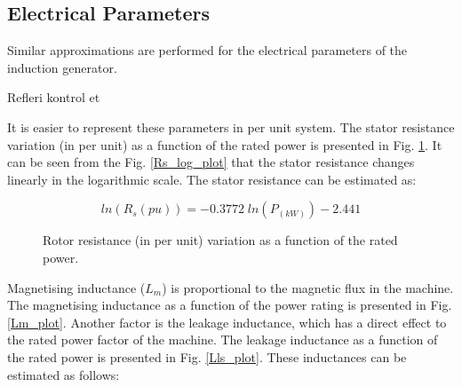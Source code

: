 \documentclass[twocolumn]{article}
\begin{document}
\subsection{Electrical Parameters} %
\label{sub:electrical_parameters}

Similar approximations are performed for the electrical parameters of the induction generator.

Refleri kontrol et \cite{Thiringer2001} 

It is easier to represent these parameters in per unit system. The stator resistance variation (in per unit) as a function of the rated power is presented in Fig. \ref{Rs}. It can be seen from the Fig. \ref{Rs_log_plot} that the stator resistance changes linearly in the logarithmic scale. The stator resistance can be estimated as:

\begin{equation}
 	ln(R_s(pu))=-0.3772\;ln (P_{(kW)}) - 2.441
 	\label{eq:Rs}
 \end{equation} 

\begin{figure}[]
  \centering

    \caption{Rotor resistance (in per unit) variation as a function of the rated power.} 
    \label{Rs}
\end{figure}

Magnetising inductance ($L_m$) is proportional to the magnetic flux in the machine. The magnetising inductance as a function of the power rating is presented in Fig. \ref{Lm_plot}. Another factor is the leakage inductance, which has a direct effect to the rated power factor of the machine. The leakage inductance as a function of the rated power is presented in Fig. \ref{Lls_plot}. These inductances can be estimated as follows:
\end{document}
